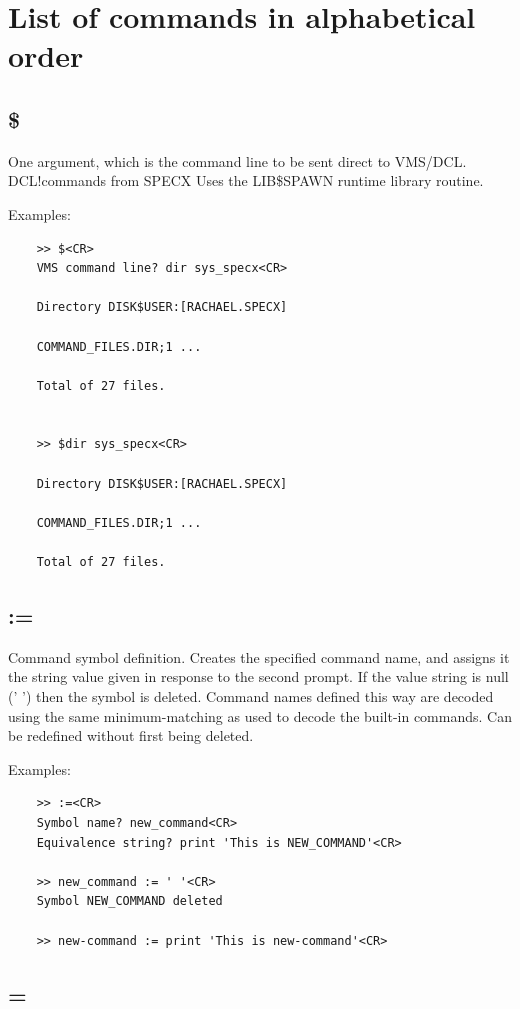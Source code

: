 \documentclass[11pt,twoside]{report}
\begin{document}
\section{List of commands in alphabetical order}
\subsection{\$} 

One argument, which is the command line to be sent direct to VMS/DCL. \index
{DCL!commands from SPECX} Uses the LIB\$SPAWN  runtime
library routine.

Examples:
\begin{verbatim}
    >> $<CR>
    VMS command line? dir sys_specx<CR>

    Directory DISK$USER:[RACHAEL.SPECX]

    COMMAND_FILES.DIR;1 ...

    Total of 27 files.


    >> $dir sys_specx<CR>

    Directory DISK$USER:[RACHAEL.SPECX]

    COMMAND_FILES.DIR;1 ...

    Total of 27 files.
\end{verbatim}

\subsection{:=} \index{:=} 

Command symbol definition. Creates the specified command name, and assigns
it the string value given in response to the second prompt. If the value
string is null (' ') then the symbol is deleted. Command names defined
this way are decoded using the same minimum-matching as used to decode the
built-in commands. Can be redefined without first being deleted.

Examples:
\begin{verbatim}
    >> :=<CR>
    Symbol name? new_command<CR>
    Equivalence string? print 'This is NEW_COMMAND'<CR>

    >> new_command := ' '<CR>
    Symbol NEW_COMMAND deleted

    >> new-command := print 'This is new-command'<CR>
\end{verbatim}

\subsection{=} \index{=} 
\end{document}
